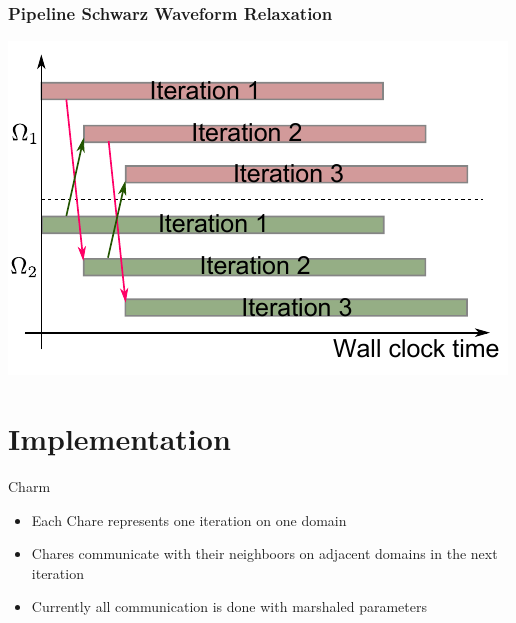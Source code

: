 \documentclass[]{beamer}
\begin{document}
\begin{frame}
  \frametitle{Pipeline Schwarz Waveform Relaxation}
  \centering
  \includegraphics[height=0.7\textheight]{figures/pswr}
\end{frame}


\section{Implementation}

\begin{frame}{Charm}

  \begin{itemize}
  \item Each Chare represents one iteration on one domain
  \item Chares communicate with their neighboors on adjacent domains
    in the next iteration
  \item Currently all communication is done with marshaled parameters
  \end{itemize}

\end{frame}
\end{document}
